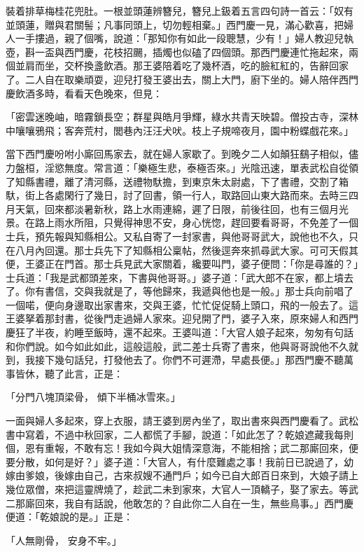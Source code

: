 \begin{showcontents}{}
裝着排草梅桂花兜肚。一根並頭蓮辨簪兒，簪兒上鈒着五言四句詩一首云：「奴有並頭蓮，贈與君關髻；凡事同頭上，切勿輕相棄。」西門慶一見，滿心歡喜，把婦人一手摟過，親了個嘴，說道：「那知你有如此一段聰慧，少有！」婦人教迎兒執壺，斟一盃與西門慶，花枝招颺，插燭也似磕了四個頭。那西門慶連忙拖起來，兩個並肩而坐，交杯換盞飲酒。那王婆陪着吃了幾杯酒，吃的臉紅紅的，告辭回家了。二人自在取樂頑耍，迎兒打發王婆出去，關上大門，廚下坐的。婦人陪伴西門慶飲酒多時，看看天色晚來，但見：

「密雲迷晚岫，暗霧鎖長空；群星與皓月爭輝，綠水共青天映碧。僧投古寺，深林中嚷嚷鴉飛；客奔荒村，閭巷內汪汪犬吠。枝上子規啼夜月，園中粉蝶戲花來。」

當下西門慶吩咐小廝回馬家去，就在婦人家歇了。到晚夕二人如顛狂鷂子相似，儘力盤桓，淫慾無度。常言道：「樂極生悲，泰極否來。」光陰迅速，單表武松自從領了知縣書禮，離了清河縣，送禮物馱擔，到東京朱太尉處，下了書禮，交割了箱馱，街上各處閑行了幾日，討了回書，領一行人，取路回山東大路而來。去時三四月天氣，回來都淡暑新秋，路上水雨連綿，遲了日限，前後往回，也有三個月光景。在路上雨水所阻，只覺得神思不安，身心恍惚，趕回要看哥哥，不免差了一個士兵，預先報與知縣相公。又私自寄了一封家書，與他哥哥武大，說他也不久，只在八月內回還。那士兵先下了知縣相公稟帖，然後逕奔來抓尋武大家。可可天假其便，王婆正在門首。那士兵見武大家關着，纔要叫門，婆子便問：「你是尋誰的？」士兵道：「我是武都頭差來，下書與他哥哥。」婆子道：「武大郎不在家，都上墳去了。你有書信，交與我就是了，等他歸來，我遞與他也是一般。」那士兵向前唱了一個喏，便向身邊取出家書來，交與王婆，忙忙促促騎上頭口，飛的一般去了。這王婆拏着那封書，從後門走過婦人家來。迎兒開了門，婆子入來，原來婦人和西門慶狂了半夜，約睡至飯時，還不起來。王婆叫道：「大官人娘子起來，匆匆有句話和你們說。如今如此如此，這般這般，武二差士兵寄了書來，他與哥哥說他不久就到，我接下幾句話兒，打發他去了。你們不可遲滯，早處長便。」那西門慶不聽萬事皆休，聽了此言，正是：

「分門八塊頂梁骨，  傾下半桶冰雪來。」

一面與婦人多起來，穿上衣服，請王婆到房內坐了，取出書來與西門慶看了。武松書中寫着，不過中秋回家，二人都慌了手腳，說道：「如此怎了？乾娘遮藏我每則個，恩有重報，不敢有忘！我如今與大姐情深意海，不能相捨；武二那廝回來，便要分散，如何是好？」婆子道：「大官人，有什麼難處之事！我前日已說過了，幼嫁由爹娘，後嫁由自己，古來叔嫂不通門戶；如今已自大郎百日來到，大娘子請上幾位眾僧，來把這靈牌燒了，趁武二未到家來，大官人一頂轎子，娶了家去。等武二那廝回來，我自有話說，他敢怎的？自此你二人自在一生，無些鳥事。」西門慶便道：「乾娘說的是。」正是：

「人無剛骨，  安身不牢。」


\end{showcontents}
